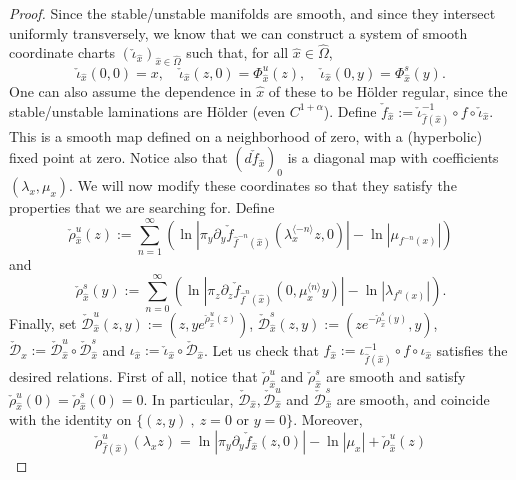 \documentclass[a4paper]{article}
\theoremstyle{definition}
\begin{document}
\begin{proof}
Since the stable/unstable manifolds are smooth, and since they intersect uniformly transversely, we know that we can construct a system of smooth coordinate charts $(\check{\iota}_{\widehat{x}})_{{\widehat{x}} \in \widehat{\Omega}}$ such that, for all ${\widehat{x}} \in \widehat{\Omega}$, $$ \check{\iota}_{\widehat{x}}(0,0) = x, \quad  \check{\iota}_{\widehat{x}}(z,0) = \Phi^u_{\widehat{x}}(z), \quad \check{\iota}_{\widehat{x}}(0,y) = \Phi_{\widehat{x}}^s(y) .$$
One can also assume the dependence in ${\widehat{x}}$ of these to be Hölder regular, since the stable/unstable laminations are Hölder (even $C^{1+\alpha}$). Define $\check{f}_{\widehat{x}} := \check{\iota}_{\widehat{f}({\widehat{x}})}^{-1} \circ f \circ \check{\iota}_{{\widehat{x}}}$. This is a smooth map defined on a neighborhood of zero, with a (hyperbolic) fixed point at zero. Notice also that $(d \check{f}_{\widehat{x}})_0$ is a diagonal map with coefficients $(\lambda_x,\mu_x)$. We will now modify these coordinates so that they satisfy the properties that we are searching for. Define
$$ \check{\rho}_{\widehat{x}}^u(z) := \sum_{n=1}^\infty \left( \ln | \pi_y \partial_y \check{f}_{\widehat{f}^{-n}({\widehat{x}})}(\lambda_x^{\langle -n \rangle} z,0)| - \ln |\mu_{f^{-n}({x})}| \right) $$
and $$ \check{\rho}_{\widehat{x}}^s(y) := \sum_{n=0}^\infty \left( \ln |\pi_z \partial_z \check{f}_{\widehat{f}^{n}({\widehat{x}})}(0,\mu_x^{\langle n \rangle} y)| - \ln |\lambda_{f^{n}(x)}| \right) .$$
Finally, set $\check{\mathcal{D}}_{\widehat{x}}^u(z,y) := (z, y  e^{\check{\rho}_{\widehat{x}}^u(z)} )$, $\check{\mathcal{D}}_{\widehat{x}}^s(z,y) := (z e^{-\check{\rho}_{\widehat{x}}^s(y)}, y)$, $\check{\mathcal{D}}_{\widehat{x}}:= \check{\mathcal{D}}_{\widehat{x}}^u \circ \check{\mathcal{D}}_{\widehat{x}}^s$ and $ \iota_{\widehat{x}} := \check{\iota}_{\widehat{x}} \circ \check{\mathcal{D}}_{\widehat{x}}$. Let us check that $f_{\widehat{x}} := \iota_{\widehat{f}({\widehat{x}})}^{-1} \circ f \circ \iota_{\widehat{x}}$ satisfies the desired relations.
First of all, notice that $\check{\rho}_{\widehat{x}}^u$ and $\check{\rho}_{\widehat{x}}^s$ are smooth and satisfy $\check{\rho}_{\widehat{x}}^u(0)=\check{\rho}_{\widehat{x}}^s(0)=0$. In particular, $\check{\mathcal{D}}_{\widehat{x}}, \check{\mathcal{D}}_{\widehat{x}}^u$ and $ \check{\mathcal{D}}_{\widehat{x}}^s$ are smooth, and coincide with the identity on $\{ (z,y) \ , \ z=0 \text{ or } y=0\}$.
Moreover, $$ \check{\rho}_{\widehat{f}({\widehat{x}})}^u({\lambda}_x z) = \ln |\pi_y \partial_y \check{f}_{{\widehat{x}}}(z,0)| - \ln |\mu_{x}| + \check{\rho}_{{\widehat{x}}}^{u}(z) $$

\end{proof}
\end{document}
